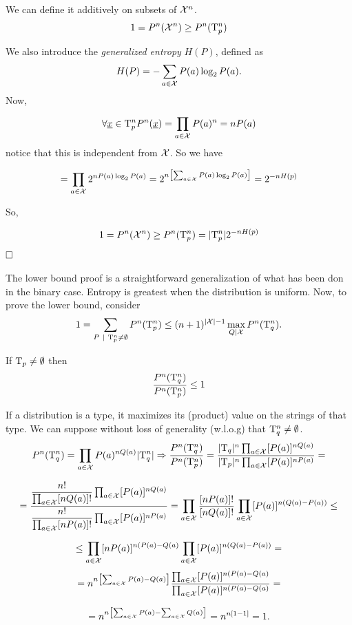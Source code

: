 We can define it additively on subsets of $\mathcal{X}^n$.
\[
1 = P^n(\mathcal{X}^n) \geq P^n(\mathrm{T}_p^n)
\]

We also introduce the \emph{generalized entropy} $H(P)$, defined as $$H(P) = -\sum_{a \in \mathcal{X}} P(a)\log_2P(a).$$
Now,

\[
\forall \underline{x} \in \mathrm{T}_p^n P^n(\underline{x}) = \prod_{a \in \mathcal{X}}P(a)^n = nP(a)
\]
notice that this is independent from $\mathcal{X}$. So we have

\[ 
= \prod_{a \in \mathcal{X}} 2^{nP(a)\log_2P(a)} = 2^{n\left[\sum_{a \in \mathcal{X}} P(a)\log_2P(a)\right]} = 2^{-nH(p)}
\]

So,

\[1 = P^n(\mathcal{X}^n) \geq P^n(\mathrm{T}^n_p) = |\mathrm{T}_p^n|2^{-nH(p)} \] $\hfill\Box$

The lower bound proof is a straightforward generalization of what has been don in the binary case. Entropy is greatest when the distribution is uniform. Now, to prove the lower bound, consider
\[
1 = \sum_{P\ |\ \mathrm{T}_p^n \not= \emptyset}P^n(\mathrm{T}_p^n) \leq (n+1)^{|\mathcal{X}|-1} \max_{Q|\mathcal{X}}P^n(\mathrm{T}_q^n).
\]

\begin{obs}
If $\mathrm{T}_p \not= \emptyset$ then $$\dfrac{P^n(\mathrm{T}^n_q)}{P^n(\mathrm{T}^n_p)} \leq 1$$
\end{obs}

If a distribution is a type, it maximizes its (product) value on the strings of that type. We can suppose without loss of generality (w.l.o.g) that $\mathrm{T}^n_q \not= \emptyset$.
\[
P^n(\mathrm{T}_q^n) = \prod_{a \in \mathcal{X}} P(a)^{nQ(a)}|\mathrm{T}_q^n| \Rightarrow \dfrac{P^n(\mathrm{T}_q^n)}{P^n(\mathrm{T}_p^n)} = \dfrac{|\mathrm{T}_q|^n\prod_{a \in \mathcal{X}}[P(a)]^{nQ(a)}}{|\mathrm{T}_p|^n\prod_{a \in \mathcal{X}}[P(a)]^{nP(a)}} =
\]

\[
 = \dfrac{\dfrac{n!}{\prod_{a\in\mathcal{X}}[nQ(a)]!}\prod_{a\in\mathcal{X}}[P(a)]^{nQ(a)}}
 {\dfrac{n!}{\prod_{a\in\mathcal{X}}[nP(a)]!}\prod_{a\in\mathcal{X}}[P(a)]^{nP(a)}} = \prod_{a \in\mathcal{X}} \dfrac{[nP(a)]!}{[nQ(a)]!}\prod_{a\in\mathcal{X}}[P(a)]^{n(Q(a)-P(a))}\leq 
\]

\[
\leq \prod_{a \in \mathcal{X}} [nP(a)]^{n(P(a)-Q(a)}\prod_{a\in\mathcal{X}}[P(a)]^{n(Q(a)-P(a))} =
\]
\[
 = n^{n\left[\sum_{a \in \mathcal{X}}P(a) - Q(a)\right ]} \dfrac{\prod_{a \in \mathcal{X}}[P(a)]^{n(P(a)-Q(a)}}{\prod_{a \in \mathcal{X}}[P(a)]^{n(P(a)-Q(a)}} =
\]

\[ 
= n^{n\left [\sum_{a \in\mathcal{X}}P(a) -\sum_{a \in\mathcal{X}}Q(a) \right]} = n^{n[1-1]} = 1.
\]


